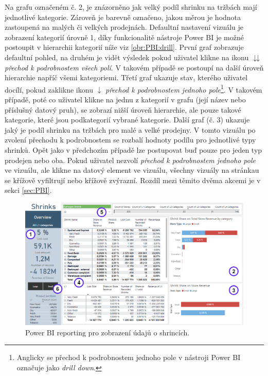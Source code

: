 Na grafu označeném č. 2, je znázorněno jak velký podíl shrinku na tržbách mají jednotlivé kategorie. Zároveň je barevně označeno, jakou měrou je hodnota zastoupená na malých či velkých prodejnách. Defaultní nastavení vizuálu je zobrazení kategorií úrovně 1, díky funkcionalitě nástroje Power BI je možné postoupit v hierarchii kategorií níže viz \ref*{obr:PBI:drill}. První graf zobrazuje defaultní pohled, na druhém je vidět výsledek pokud uživatel klikne na ikonu $\downdownarrows$ \emph{přechod k podrobnostem všech polí}. V takovém případě se postoupí na další úroveň hierarchie napříč všemi kategoriemi. Třetí graf ukazuje stav, kterého uživatel docílí, pokud zaklikne ikonu $\downarrow$ \emph{přechod k podrobnostem jednoho pole}\footnote{Anglicky se přechod k podrobnostem jednoho pole v nástroji Power BI označuje jako \emph{drill down}.}. V takovém případě, poté co uživatel klikne na jednu z kategorií v grafu (její název nebo příslušný datový pruh), se zobrazí nižší úroveň hierarchie, ale pouze takové kategorie, které jsou podkategorií vybrané kategorie. 
Další graf (č. 3) ukazuje jaký je podíl shrinku na tržbách pro malé a velké prodejny. V tomto vizuálu po zvolení přechodu k podrobnostem se rozbalí hodnoty podílu pro jednotlivé typy shrinků. Opět jako v předchozím případě lze postupovat buď pouze pro jeden typ prodejen nebo oba.
Pokud uživatel nezvolí \emph{přechod k podrobnostem jednoho pole} ve vizuálu, ale klikne na datový element ve vizuálu, všechny vizuály na stránkau se křížově vyfiltrují nebo křížově zvýrazní. Rozdíl mezi těmito dvěma akcemi je v sekci \ref*{sec:PBI}. 
\begin{figure}[hbtp!]
    \centering
    \captionsetup{justification=centering}
    \includegraphics[width=\textwidth]{obrazky/PBI/overview.png}
    \caption{Power BI reporting pro zobrazení údajů o shrincích.}
    \label{obr:PBI:overview}
\end{figure}

